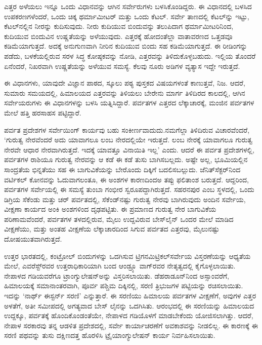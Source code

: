 ಎತ್ತರ ಅಳೆಯಲು ಇನ್ನೂ ಒಂದು ವಿಧಾನವನ್ನು ಆಗಿನ ಸರ್ವೇರುಗಳು ಬಳಸಿಕೊಂಡಿದ್ದರು. ಈ ವಿಧಾನದಲ್ಲಿ ಬಳಸಿದ ಉಪಕರಣಗಳೆಂದರೆ, ಒಂದು ಚಿಕ್ಕ ಥರ್ಮಾಮೀಟರ್​ ಮತ್ತು ಒಂದು ಕೆಟಲ್​. ಸರ್ವೇ ತಾಣದಲ್ಲಿ ಕೆಟಲ್​ನ್ನು ಇಟ್ಟು, ಕೆಟಲ್​ನಲ್ಲಿನ ನೀರನ್ನು ಕುದಿಸುವುದು. ನೀರು ಕುದಿಯುವ ಬಿಂದುವನ್ನು ತಲುಪಿದಾಗ ಥರ್ಮಾಮೀಟರಿನಿಂದ, ಕುದಿಯುವ ಬಿಂದುವಿನ ಉಷ್ಣತೆಯನ್ನು ಅಳೆಯುವುದು. ಎತ್ತರಕ್ಕೆ ಹೋದಂತೆಲ್ಲಾ ವಾತಾವರಣದ ಒತ್ತಡವೂ ಕಡಿಮೆಯಾಗುತ್ತದೆ. ಅದಕ್ಕೆ ಅನುಗುಣವಾಗಿ ನೀರಿನ ಕುದಿಯುವ ಬಿಂದು ಸಹ ಕಡಿಮೆಯಾಗುತ್ತದೆ. ಈ ರೀಡಿಂಗನ್ನು ಪಡೆದು, ಬಳಕೆಯಲ್ಲಿರುವ ಸರಳ ಸಿದ್ಧ ಕೋಷ್ಠಕವನ್ನು ನೋಡಿ, ಎತ್ತರವನ್ನು ತಿಳಿದುಕೊಳ್ಳಬಹುದು. ಇಲ್ಲಿಯ ತೊಂದರೆ ಏನೆಂದರೆ, ನಿಖರವಾಗಿ ಉಷ್ಣತೆಯನ್ನು ಅಳೆಯುವ ಸಮಸ್ಯೆ. ಕೆಲವು ನೂರು ಅಡಿಗಳ ವ್ಯತ್ಯಾಸ ಇದ್ದೇ ಇರುತ್ತದೆ.

ಈ ವಿಧಾನಗಳು, ಯಾವುದೇ ವಿಜ್ಞಾನ ಪಾಠದ, ಸ್ಕೂಲು ಪಠ್ಯ ಪುಸ್ತಕದ ವಿಷಯಗಳಂತೆ ಕಾಣುತ್ತವೆ, ನಿಜ. ಆದರೆ, ಸುಮಾರು  ಸಮಯದಲ್ಲಿ, ಹಿಮಾಲಯದ ಎತ್ತರವನ್ನು ತಿಳಿಯಲು ಬೇರೇನು ಮಾರ್ಗ ತಿಳಿದಿರದ ಕಾಲದಲ್ಲಿ, ಆಗಿನ ಸರ್ವೇಯರುಗಳು ಈ ವಿಧಾನಗಳನ್ನು ಬಳಸಿ ಯತ್ನಿಸಿದ್ದಾರೆ. ಪರ್ವತಗಳ ಎತ್ತರದ ಲೆಕ್ಕಾಚಾರಕ್ಕೆ, ಮಂಜಿನ ಪರ್ವತಗಳ ಮೇಲೆ ಹತ್ತಿ ಹರಸಾಹಸ ಪಟ್ಟಿದ್ದಾರೆ.

ಪರ್ವತ ಪ್ರದೇಶಗಳ ಸರ್ವೇಯಿಂಗ್​ ಕಾರ್ಯವು ಬಹು ಸಂಕೀರ್ಣವಾದುದು.\break ನಮಗೆಲ್ಲಾ ತಿಳಿದಿರುವ ವಿಚಾರವೆಂದರೆ, ‘ಗುರುತ್ವ ನೇರವೆಂದರೆ ಅದು ಯಾವಾಗಲೂ ಲಂಬ ನೇರದಲ್ಲಿಯೇ ಇರುತ್ತದೆ. ಲಂಬ ನೇರಕ್ಕೆ ಯಾವಾಗಲೂ ಗುರುತ್ವ ನೇರವೇ ಆಧಾರ ನೇರವಾಗಿರುತ್ತದೆ. ಇದಕ್ಕೆ ಯಾವತ್ತೂ ವಿನಾಯಿತಿ ಇಲ್ಲ’ ಎಂದು. ಆದರೆ ಈ ಪರ್ವತ ಪ್ರದೇಶಗಳಲ್ಲಿ, ಪರ್ವತಗಳ ರಾಶಿಯೂ ಗುರುತ್ವ ನೇರವನ್ನು ಆ ಕಡೆ ಈ ಕಡೆ ತುಸು ಬಾಗಿಸಬಲ್ಲದು. ಅಷ್ಟೇ ಅಲ್ಲ, ಭೂಮಿಯಲ್ಲಿನ ಸಾಂದ್ರತೆಯ ಭಿನ್ನತೆಯು ಸಹ ಈ ಬಾಗುವಿಕೆಯನ್ನು ಬೇರೊಂದು ದಿಕ್ಕಿಗೆ ಬದಲಿಸಬಲ್ಲುದು. ಜೆನಿತ್​ ಸೆಕ್ಟರ್​ನಿಂದ ವರ್ಟಿಕಲ್​ ಕೋನವನ್ನು ಓದುವಾಗಲಂತೂ, ಈ ಅಂಶಗಳ ಕಾರಣದಿಂದಅ ತಪ್ಪು ಫಲಿತಾಂಶ ಬರುತ್ತದೆ. ಆದ್ದರಿಂದ, ಪರ್ವತಗಳ ಸರ್ವೇಯಲ್ಲಿ ಈ ಸಮಸ್ಯೆ ತುಂಬಾ ಗಂಭೀರ ಸ್ವರೂಪದ್ದಾಗಿರುತ್ತದೆ. ಸಹರನಪುರ ಎಂಬ ಸ್ಥಳದಲ್ಲಿ, ಒಂದು ಡಿಗ್ರಿಯ  ಸೆಕೆಂಡು ಮತ್ತು ಚರ್​ ಪರ್ವತದಲ್ಲಿ,  ಸೆಕೆಂಡ್​ನಷ್ಟು ಗುರುತ್ವ ನೇರವು ಬಾಗಿರುವುದು ಅಂದಿನ ಸರ್ವೇಯ, ವೀಕ್ಷಣಾ ಕಾರ್ಯದ ಅಂಕಿ ಅಂಶಗಳಿಂದ ದೃಢಪಟ್ಟಿತು. ಈ ಪ್ರಮಾಣದ ಗುರುತ್ವ ನೇರ ಬಾಗುವಿಕೆಯ ಪರಿಣಾಮವೆಂದರೆ, ಪರ್ವತಗಳ ತಳದಲ್ಲಿರುವ,  ಮೈಲು ಉದ್ದವಿರುವ ಬೇಸ್​ಲೈನ್​ ಒಂದರ ಮೇಲೆ ಮಾಡಿದ ವೀಕ್ಷಣೆಯು, ಮತ್ತು ಅಂತಹ ವೀಕ್ಷಣೆಯ ಲೆಕ್ಕಾಚಾರದಿಂದ ಸಿಗುವ ಪರ್ವತದ ಎತ್ತರವು,  ಮೈಲುನಷ್ಟು ದೋಷಯುತವಾಗಿರುತ್ತದೆ.

ಉತ್ತರ ಭಾರತದಲ್ಲಿ, ಕಂಟ್ರೋಲ್​ ಬಿಂದುಗಳನ್ನು ಒದಗಿಸುವ ಟ್ರಿಗನಮಿಟ್ರಿಕಲ್​\break ಸರ್ವೇಯ ವಿಸ್ತರಣೆಯನ್ನು ಆಧ್ಯತೆಯ ಮೇಲೆ, ಎವರೆಸ್ಟ್​ರವರ ಉತ್ತರಾಧಿಕಾರಿಯಾಗಿ ಬಂದ ಆಂಡ್ರ್ಯೂ ವಾಗ್​ರವರ ನೇತೃತ್ವದಲ್ಲಿ ಕೈಗೊಳ್ಳಲಾಯಿತು. ನೇಪಾಳದ ಗಡಿಯವರೆಗೂ ಟ್ರಾಂಗ್ಯುಲೇಷನ್​ಅನ್ನು ವಿಸ್ತರಿಸಲಾಯಿತು. ಡೆಹರಾಡೂನ್​ನಿಂದ ಅಸ್ಸಾಂವರೆಗೆ, ಹಿಮಾಲಯಕ್ಕೆ ಸಮಾನಾಂತರವಾಗಿ, ಪೂರ್ವ ಪಶ್ಚಿಮ ದಿಕ್ಕಿನಲ್ಲಿ, ಸರಣಿ ತ್ರಿಭುಜಗಳ ಪಟ್ಟಿಯನ್ನು ರಚಿಸಲಾಯಿತು. ಇದನ್ನು ‘ನಾರ್ಥ್ ಈಸ್ಟರ್ನ್ ಸರಣಿ’ ಎನ್ನುತ್ತಾರೆ. ಈ ಸರಣಿಯು ಹಿಮಾಲಯ ಪರ್ವತಗಳ ವೀಕ್ಷಣೆಗೆ, ಅವುಗಳ ಎತ್ತರ ಅಳತೆಗೆ, ಅತೀ ಸಮೀಪದಲ್ಲಿ ಅಗತ್ಯವಾದ ಬೇಸ್​ ಲೈನನ್ನು ಒದಗಿಸಿತು. ಆರಂಭದಲ್ಲಿ ಈ ಸರಣಿಯನ್ನು ಹಿಮಾಲಯದ ಉದ್ದಕ್ಕೂ, ಪರ್ವತಕ್ಕೆ ಹೊಂದಿಕೊಂಡಂತೆಯೇ, ನೇಪಾಳದ ಗಡಿಯೊಳಗೆ ಮಾಡಬೇಕೆಂದು ಯೋಜಿಸಲಾಗಿತ್ತು. ಆದರೆ, ನೇಪಾಳ ಸರಕಾರವು ತನ್ನ ಆಡಳಿತ ಪ್ರದೇಶದಲ್ಲಿ, ಸರ್ವೇ ಕಾರ್ಯಾಚರಣೆಗೆ ಅವಕಾಶವನ್ನು ನೀಡಲಿಲ್ಲ. ಈ ಕಾರಣಕ್ಕೆ ಈ ಸರಣಿ ಪಥವನ್ನು ತುಸು ದಕ್ಷಿಣದತ್ತ ಹೊರಳಿಸಿ ಟ್ರೈಯಾಂಗ್ಯುಲೇಷನ್​ ಕಾರ್ಯ ನಿರ್ವಹಿಸಲಾಯಿತು.

